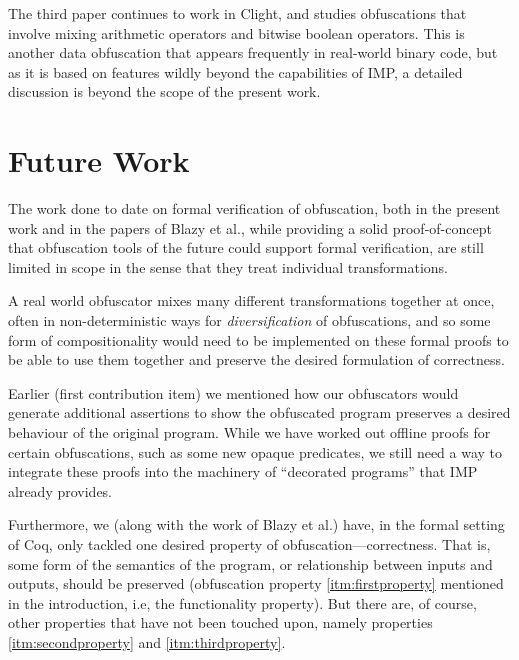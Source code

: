 \documentclass[compsoc,conference,a4paper,10pt,times]{IEEEtran}
\begin{document}
The third paper
\cite{Blazy3} continues to work in Clight, and studies obfuscations that involve mixing arithmetic operators and bitwise boolean operators.  This is another data obfuscation that appears frequently in real-world binary code, but as it is based on features wildly beyond the capabilities of IMP, a detailed discussion is beyond the scope of the present work.

\section{Future Work}
The work done to date on formal verification of obfuscation, both in the present work and in the papers of Blazy et al., while providing a solid proof-of-concept that obfuscation tools of the future could support formal verification, are still limited in scope in the sense that they treat individual transformations.

A real world obfuscator mixes many different transformations together at once, often in non-deterministic ways for \emph{diversification} of obfuscations, and so some form of compositionality would need to be implemented on these formal proofs to be able to use them together and preserve the desired formulation of correctness. 

Earlier (first contribution item) we mentioned how our obfuscators would generate additional assertions to show the obfuscated program preserves a desired behaviour of the original program. While we have worked out offline proofs for certain obfuscations, such as some new opaque predicates, we still need a way to integrate these proofs into the machinery of ``decorated programs'' that IMP already provides. 

Furthermore, we (along with the work of Blazy et al.)
have, in the formal setting of Coq, only tackled one desired property of obfuscation---correctness.  That is, some form of the semantics of the program, or relationship between inputs and outputs, should be preserved (obfuscation property \ref{itm:firstproperty} mentioned in the introduction, i.e, the functionality property). But there are, of course, other properties that have not been touched upon, namely properties \ref{itm:secondproperty} and \ref{itm:thirdproperty}.
\end{document}
